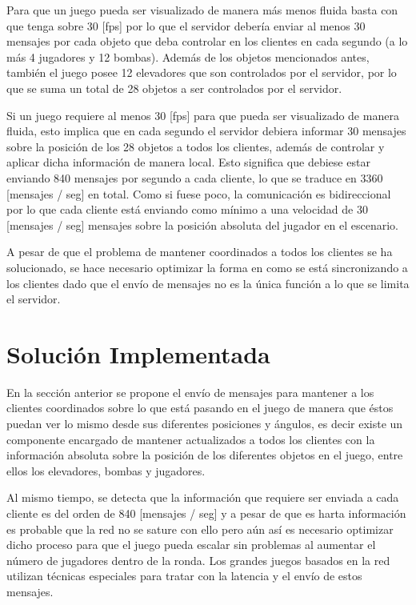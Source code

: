 \documentclass[a4paper,12pt,openany,oneside]{book}
\begin{document}
Para que un juego pueda ser visualizado de manera más menos fluida basta con que tenga sobre 30 [fps] \cite{VALVE1} por lo que el servidor debería enviar al menos 30 mensajes por cada objeto que deba controlar en los clientes en cada segundo (a lo más 4 jugadores y 12 bombas). Además de los objetos mencionados antes, también el juego posee 12 elevadores que son controlados por el servidor, por lo que se suma un total de 28 objetos a ser controlados por el servidor.

Si un juego requiere al menos 30 [fps] para que pueda ser visualizado de manera fluida, esto implica que en cada segundo el servidor debiera informar 30 mensajes sobre la posición de los 28 objetos a todos los clientes, además de controlar y aplicar dicha información de manera local. Esto significa que debiese estar enviando 840 mensajes por segundo a cada cliente, lo que se traduce en 3360 [mensajes / seg] en total. Como si fuese poco, la comunicación es bidireccional por lo que cada cliente está enviando como mínimo a una velocidad de 30 [mensajes / seg] mensajes sobre la posición absoluta del jugador en el escenario.

A pesar de que el problema de mantener coordinados a todos los clientes se ha solucionado, se hace necesario optimizar la forma en como se está sincronizando a los clientes dado que el envío de mensajes no es la única función a lo que se limita el servidor. 
\section{Solución Implementada}
En la sección anterior se propone el envío de mensajes para mantener a los clientes coordinados sobre lo que está pasando en el juego de manera que éstos puedan ver lo mismo desde sus diferentes posiciones y ángulos, es decir existe un componente encargado de mantener actualizados a todos los clientes con la información absoluta sobre la posición de los diferentes objetos en el juego, entre ellos los elevadores, bombas y jugadores.

Al mismo tiempo, se detecta que la información que requiere ser enviada a cada cliente es del orden de 840 [mensajes / seg] y a pesar de que es harta información es probable que la red no se sature con ello pero aún así es necesario optimizar dicho proceso para que el juego pueda escalar sin problemas al aumentar el número de jugadores dentro de la ronda. Los grandes juegos basados en la red utilizan técnicas especiales para tratar con la latencia y el envío de estos mensajes.
\end{document}
